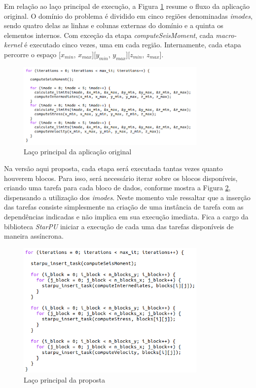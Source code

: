 \documentclass[cic,tc]{iiufrgs}
\begin{document}
Em relação ao laço principal de execução, a Figura \ref{fig:main_loop} resume o fluxo da aplicação original. O domínio do problema é dividido em cinco regiões denominadas \textit{imodes},
sendo quatro delas as linhas e colunas externas do domínio e a quinta os elementos internos. Com exceção da etapa \textit{computeSeisMoment}, cada \textit{macro-kernel} é executado cinco
vezes, uma em cada região. Internamente, cada etapa percorre o espaço [$x_{min}$, $x_{max}$][$y_{min}$, $y_{max}$][$z_{min}$, $z_{max}$].

\begin{figure}[!htb]
    \caption{Laço principal da aplicação original}
    \begin{center}
      \includegraphics[width=25em]{main_loop}
    \end{center}
    \label{fig:main_loop}
\end{figure}

Na versão aqui proposta, cada etapa será executada tantas vezes quanto houverem blocos. Para isso, será necessário iterar sobre os blocos disponíveis, criando uma tarefa para cada bloco
de dados, conforme mostra a Figura \ref{fig:new_main_loop}, dispensando a utilização dos \textit{imodes}. Neste momento vale ressaltar que a inserção das tarefas consiste
simplesmente na criação de uma instância de tarefa com as dependências indicadas e não implica em sua execução imediata. Fica a cargo da biblioteca \textit{StarPU} iniciar a execução
de cada uma das tarefas disponíveis de maneira assíncrona.

\begin{figure}[!htb]
    \caption{Laço principal da proposta}
    \begin{center}
      \includegraphics[width=25em]{new_main_loop}
    \end{center}
    \label{fig:new_main_loop}
\end{figure}
\end{document}
